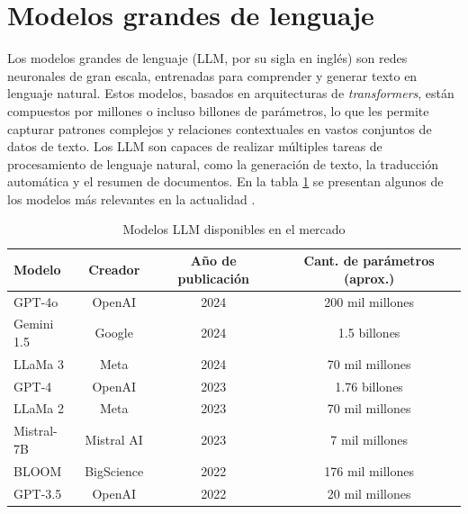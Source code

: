 \section{Modelos grandes de lenguaje}

Los modelos grandes de lenguaje (LLM, por su sigla en inglés) son redes neuronales de gran escala, entrenadas 
para comprender y generar texto en lenguaje natural. Estos modelos, basados en arquitecturas de \textit{transformers}, 
están compuestos por millones o incluso billones de parámetros, lo que les permite capturar patrones complejos y 
relaciones contextuales en vastos conjuntos de datos de texto. Los LLM son capaces de realizar múltiples 
tareas de procesamiento de lenguaje natural, como la generación de texto, la traducción 
automática y el resumen de documentos. En la tabla \ref{tab:llms} se presentan 
algunos de los modelos más relevantes en la actualidad \citep{website:lifearchitect}.

\vspace{5mm}

\begin{table}[h]
	\centering
	\caption[Modelos LLM disponibles en el mercado]{Modelos LLM disponibles en el mercado}
	\begin{tabular}{l c c c}    
		\toprule
		\textbf{Modelo} 	 & \textbf{Creador} 	& \textbf{Año de publicación}  & \textbf{Cant. de parámetros (aprox.)}\\
		\midrule
		GPT-4o               & OpenAI 				& 2024                         & 200 mil millones\\		
		Gemini 1.5      	 & Google				& 2024                         & 1.5 billones\\
		LLaMa 3         	 & Meta				    & 2024                         & 70 mil millones\\
        GPT-4         	     & OpenAI				& 2023                         & 1.76 billones\\
        LLaMa 2         	 & Meta				    & 2023                         & 70 mil millones\\
        Mistral-7B         	 & Mistral AI		    & 2023                         & 7 mil millones\\
        BLOOM         	     & BigScience		    & 2022                         & 176 mil millones\\
        GPT-3.5         	 & OpenAI				& 2022                         & 20 mil millones\\
		\bottomrule
		\hline
	\end{tabular}
	\label{tab:llms}
\end{table}

